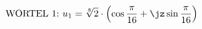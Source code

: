 \begin{equation}
\text{WORTEL 1:~} u_1 = \sqrt[8]{2} \cdot \left(\cos \frac{\pi}{16} +
\jz \sin \frac{\pi}{16} \right)
\end{equation}
